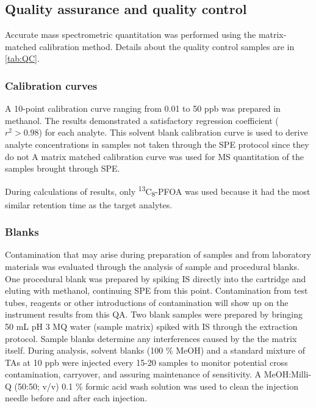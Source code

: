 

\subsection{Quality assurance and quality control}
Accurate mass spectrometric quantitation was performed using the matrix-matched calibration method. Details about the quality control samples are in \cref{tab:QC}.

\subsubsection{Calibration curves}
A 10-point calibration curve ranging from 0.01 to 50 ppb was prepared in methanol. The results demonstrated a satisfactory regression coefficient ($r^2 > 0.98$) for each analyte. This solvent blank calibration curve is used to derive analyte concentrations in samples not taken through the SPE protocol since they do not  A matrix matched calibration curve was used for MS quantitation  of the samples brought through SPE. 

During calculations of results, only \textsuperscript{13}C\textsubscript{8}-PFOA was used because it had the most similar retention time as the target analytes. 


\subsubsection{Blanks}
Contamination that may arise during preparation of samples and from laboratory materials was evaluated through the analysis of sample and procedural blanks. One procedural blank was prepared by spiking IS directly into the cartridge and eluting with methanol, continuing SPE from this point. Contamination from test tubes, reagents or other introductions of contamination will show up on the instrument results from this QA. Two blank samples were prepared by bringing 50 mL pH 3 MQ water (sample matrix) spiked with IS through the extraction protocol. Sample blanks determine any interferences caused by the the matrix itself. During analysis, solvent blanks (100 \% MeOH) and a standard mixture of TAs at 10 ppb were injected every 15-20 samples to monitor potential cross contamination, carryover, and assuring maintenance of sensitivity. A MeOH:Milli-Q (50:50; v/v) 0.1 \% formic acid wash solution was used to clean the injection needle before and after each injection.

